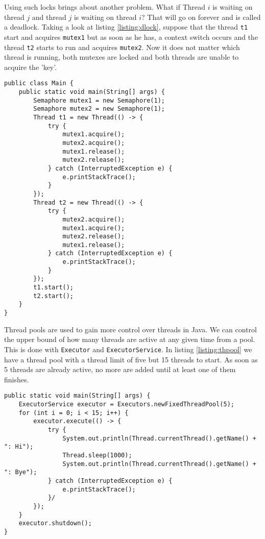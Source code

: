 Using such locks brings about another problem. What if Thread $i$ is waiting on thread $j$ and thread $j$ is waiting on thread $i$? That will go on forever and is called a deadlock. Taking a look at listing \ref{listing:dlock}, suppose that the thread \texttt{t1} start and acquires \texttt{mutex1} but as soon as he has, a context switch occurs and the thread \texttt{t2} starts to run and acquires \texttt{mutex2}. Now it does not matter which thread is running, both mutexes are locked and both threads are unable to acquire the 'key'.

\begin{lstlisting}[style=A_Java, caption={\href{https://github.com/JonSteinn/AndroidDevelopment/blob/master/examples/lab2/javathreads/5/Main.java}{Deadlock}}, label={listing:dlock}]
public class Main {
    public static void main(String[] args) {
        Semaphore mutex1 = new Semaphore(1);
        Semaphore mutex2 = new Semaphore(1);
        Thread t1 = new Thread(() -> {
            try {
                mutex1.acquire();
                mutex2.acquire();
                mutex1.release();
                mutex2.release();
            } catch (InterruptedException e) {
                e.printStackTrace();
            }
        });
        Thread t2 = new Thread(() -> {
            try {
                mutex2.acquire();
                mutex1.acquire();
                mutex2.release();
                mutex1.release();
            } catch (InterruptedException e) {
                e.printStackTrace();
            }
        });
        t1.start();
        t2.start();
    }
}
\end{lstlisting}

Thread pools are used to gain more control over threads in Java. We can control the upper bound of how many threads are active at any given time from a pool. This is done with \texttt{Executor} and \texttt{ExecutorService}. In listing \ref{listing:thpool} we have a thread pool with a thread limit of five but 15 threads to start. As soon as 5 threads are already active, no more are added until at least one of them finishes.

\begin{lstlisting}[style=A_Java, caption={\href{https://github.com/JonSteinn/AndroidDevelopment/blob/master/examples/lab2/javathreads/6/Main.java}{Thread pool}}, label={listing:thpool}]
public static void main(String[] args) {
    ExecutorService executor = Executors.newFixedThreadPool(5);
    for (int i = 0; i < 15; i++) {
        executor.execute(() -> {
            try {
                System.out.println(Thread.currentThread().getName() + ": Hi");
                Thread.sleep(1000);
                System.out.println(Thread.currentThread().getName() + ": Bye");
            } catch (InterruptedException e) {
                e.printStackTrace();
            }/
        });
    }
    executor.shutdown();
}
\end{lstlisting}



